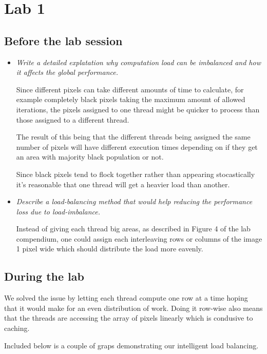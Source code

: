 \documentclass[a4paper,12pt]{article}
\begin{document}
\section{Lab 1}
\subsection{Before the lab session}

\begin{itemize}
\item \textit{Write a detailed explatation why computation load can be imbalanced and how it affects the global performance.}

  Since different pixels can take different amounts of time to calculate, for example completely black pixels taking the maximum amount of allowed iterations, the pixels assigned to one thread might be quicker to process than those assigned to a different thread.

  The result of this being that the different threads being assigned the same number of pixels will have different execution times depending on if they get an area with majority black population or not.

  Since black pixels tend to flock together rather than appearing stocastically it's reasonable that one thread will get a heavier load than another.


\item \textit{Describe a load-balancing method that would help reducing the performance loss due to load-imbalance.}

Instead of giving each thread big areas, as described in Figure 4 of the lab compendium, one could assign each interleaving rows or columns of the image 1 pixel wide which should distribute the load more eavenly.

\end{itemize}



\subsection{During the lab}

We solved the issue by letting each thread compute one row at a time hoping that it would make for an even distribution of work. Doing it row-wise also means that the threads are accessing the array of pixels linearly which is condusive to caching.

Included below is a couple of graps demonstrating our intelligent load balancing.
\end{document}
